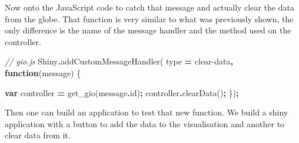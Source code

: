 \documentclass[
]{krantz}
\makeatletter
\newenvironment{Shaded}{\begin{snugshade}}{\end{snugshade}}
\newcommand{\AttributeTok}[1]{\textcolor[rgb]{0.61,0.61,0.61}{#1}}
\newcommand{\CommentTok}[1]{\textcolor[rgb]{0.37,0.37,0.37}{\textit{#1}}}
\newcommand{\FunctionTok}[1]{\textcolor[rgb]{0,0,0}{#1}}
\newcommand{\KeywordTok}[1]{\textcolor[rgb]{0.27,0.27,0.27}{\textbf{#1}}}
\newcommand{\NormalTok}[1]{#1}
\newcommand{\OperatorTok}[1]{\textcolor[rgb]{0.43,0.43,0.43}{\textbf{#1}}}
\newcommand{\StringTok}[1]{\textcolor[rgb]{0.5,0.5,0.5}{#1}}
\newenvironment{kframe}{%
\medskip{}
\setlength{\fboxsep}{.8em}
 \def\at@end@of@kframe{}%
 \ifinner\ifhmode%
  \def\at@end@of@kframe{\end{minipage}}%
  \begin{minipage}{\columnwidth}%
 \fi\fi%
 \def\FrameCommand##1{\hskip\@totalleftmargin \hskip-\fboxsep
 \colorbox{shadecolor}{##1}\hskip-\fboxsep
     \hskip-\linewidth \hskip-\@totalleftmargin \hskip\columnwidth}%
 \MakeFramed {\advance\hsize-\width
   \@totalleftmargin\z@ \linewidth\hsize
   \@setminipage}}%
 {\par\unskip\endMakeFramed%
 \at@end@of@kframe}
\renewenvironment{Shaded}{\begin{kframe}}{\end{kframe}}
\makeatother
\begin{document}
Now onto the JavaScript code to catch that message and actually clear the data from the globe. That function is very similar to what was previously shown, the only difference is the name of the message handler and the method used on the controller.

\begin{Shaded}
\begin{Highlighting}[]
\CommentTok{// gio.js}
\NormalTok{Shiny}\OperatorTok{.}\FunctionTok{addCustomMessageHandler}\NormalTok{(}
\NormalTok{  type }\OperatorTok{=} \StringTok{\textquotesingle{}clear{-}data\textquotesingle{}}\OperatorTok{,} \KeywordTok{function}\NormalTok{(message) \{}

    \KeywordTok{var}\NormalTok{ controller }\OperatorTok{=}\NormalTok{ get\_gio(message}\OperatorTok{.}\AttributeTok{id}\NormalTok{)}\OperatorTok{;}
\NormalTok{    controller}\OperatorTok{.}\FunctionTok{clearData}\NormalTok{()}\OperatorTok{;}
\NormalTok{\})}\OperatorTok{;}
\end{Highlighting}
\end{Shaded}

Then one can build an application to test that new function. We build a shiny application with a button to add the data to the visualisation and another to clear data from it.
\end{document}
